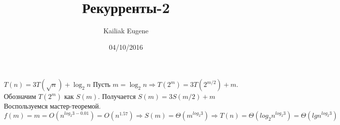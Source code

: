 \documentclass[12pt]{article}
\title{Рекурренты-2}
\date{04/10/2016}
\author{Kailiak Eugene}
\begin{document}
\maketitle
$ T(n) = 3T(\sqrt{n}) + \log_2{n}$ Пусть $m = \log_2{n} \Rightarrow T(2^m) = 3T (2^{m/2}) + m $. Обозначим $T(2^m)$ как $S(m)$. Получается $ S(m) = 3S(m/2) + m$ \\
Воспользуемся мастер-теоремой. $f(m) = m = O(n^{log_2{3} - 0.01}) = O(n^{1.57}) \Rightarrow S(m) = \Theta (m^{log_2{3}})  \Rightarrow T(n) = \Theta (log_2{n}^{log_2{3}}) = \Theta (lg{n^{log_2{3}}})$\\
\end{document}
